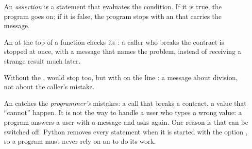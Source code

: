 \begin{definition}[Assertion]\label{def:g10:specifications-and-tests:assertion}
An \emph{assertion} is a statement  that evaluates the
condition. If it is true, the program goes on; if it is false, the program stops with an 
that carries the message.
\end{definition}

An  at the top of a function checks its : a caller who breaks the contract is stopped at once,
with a message that names the problem, instead of receiving a strange result much later.

\label{lst:g10:specifications-and-tests:average}

\label{out:g10:specifications-and-tests:average}

Without the ,  would stop too, but with  on the line
: a message about division, not about the caller's mistake.

\begin{remark}\label{rem:g10:specifications-and-tests:what-for}
An  catches the \emph{programmer's} mistakes: a call that breaks a contract, a value that ``cannot''
happen. It is not the way to handle a user who types a wrong value: a program answers a user with a message and
asks again. One reason is that  can be switched off.
Python removes every  statement when it is started with the option , so a program must
never rely on an  to do its work.
\end{remark}

